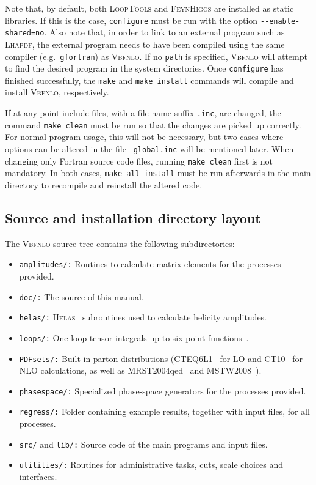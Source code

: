 \documentclass[english,12pt]{article}
\begin{document}
Note that, by default, both \textsc{LoopTools} and \textsc{FeynHiggs} are
installed as static libraries.  If this is the case, {\tt configure} must be run
with the option {\tt -{}-enable-shared=no}.  Also note that, in order to link to
an external program such as \textsc{Lhapdf}, the external program needs to have
been compiled using the same compiler (e.g.\ {\tt gfortran}) as \textsc{Vbfnlo}.
If no {\tt path} is specified, \textsc{Vbfnlo} will attempt to find the desired
program in the system directories.  Once {\tt configure} has finished
successfully, the {\tt make} and {\tt make install} commands will compile and
install \textsc{Vbfnlo}, respectively.

If at any point include files, with a file name suffix {\tt .inc}, are
changed, the command {\tt make clean} must be run so that the changes
are picked up correctly. For normal program usage, this will not be
necessary, but two cases where options can be altered in the file {\tt
global.inc} will be mentioned later.
When changing only Fortran source code files, running {\tt make clean}
first is not mandatory. In both cases, {\tt make all install} must be
run afterwards in the main directory to recompile and reinstall the
altered code.



\subsection{Source and installation directory layout}

The \textsc{Vbfnlo} source tree contains the following subdirectories:
\begin{itemize}
\item {\tt amplitudes/:} Routines to calculate matrix elements for the processes
provided.
\item {\tt doc/:} The source of this manual.
\item {\tt helas/:} \textsc{Helas}~\cite{Murayama:1992gi} subroutines used
to calculate helicity amplitudes.
\item {\tt loops/:} One-loop tensor integrals up to six-point functions~\cite{Campanario:2011cs}.
\item {\tt PDFsets/:} Built-in parton distributions
(CTEQ6L1~\cite{Pumplin:2002vw} for LO and CT10~\cite{Lai:2010vv} for NLO
calculations, as well as MRST2004qed~\cite{Martin:2004dh} and MSTW2008~\cite{Martin:2009iq}). 
\item {\tt phasespace/:} Specialized phase-space generators for the processes
provided.
\item {\tt regress/:} Folder containing example results, together with input
files, for all processes.
\item {\tt src/} and {\tt lib/:} Source code of the main programs and input files. 
\item {\tt utilities/:} Routines for administrative tasks, cuts, scale choices
and interfaces.
\end{itemize} 
\end{document}
